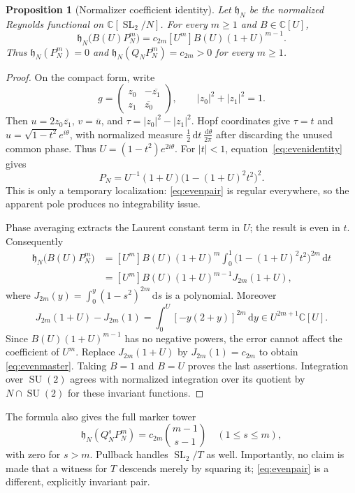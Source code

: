 \documentclass[11pt]{article}
\numberwithin{equation}{section}
\newtheorem{proposition}[theorem]{Proposition}
\theoremstyle{definition}
\theoremstyle{remark}
\newcommand{\C}{\mathbb C}
\newcommand{\dd}{\,\mathrm d}
\DeclareMathOperator{\SL}{SL}
\DeclareMathOperator{\SU}{SU}
\begin{document}
\begin{proposition}[Normalizer coefficient identity]\label{prop:normalizer}
Let $\mathfrak h_N$ be the normalized Reynolds functional on $\C[\SL_2/N]$. For every $m\geq1$ and $B\in\C[U]$,
\begin{equation}\label{eq:evenmaster}
 \mathfrak h_N\bigl(B(U)P_N^m\bigr)
 =c_{2m}[U^m]B(U)(1+U)^{m-1}.
\end{equation}
Thus $\mathfrak h_N(P_N^m)=0$ and $\mathfrak h_N(Q_NP_N^m)=c_{2m}>0$ for every $m\geq1$.
\end{proposition}
\begin{proof}
On the compact form, write
\[
 g=\begin{pmatrix}z_0&-\overline{z_1}\\ z_1&\overline{z_0}\end{pmatrix},
 \qquad |z_0|^2+|z_1|^2=1.
\]
Then $u=2z_0\overline{z_1}$, $v=\overline u$, and $\tau=|z_0|^2-|z_1|^2$. Hopf coordinates give $\tau=t$ and $u=\sqrt{1-t^2}e^{i\theta}$, with normalized measure $\frac12\dd t\,\frac{\dd\theta}{2\pi}$ after discarding the unused common phase. Thus $U=(1-t^2)e^{2i\theta}$. For $|t|<1$, equation~\eqref{eq:evenidentity} gives
\[
 P_N=U^{-1}(1+U)\bigl(1-(1+U)^2t^2\bigr)^2.
\]
This is only a temporary localization: \eqref{eq:evenpair} is regular everywhere, so the apparent pole produces no integrability issue.

Phase averaging extracts the Laurent constant term in $U$; the result is even in $t$. Consequently
\begin{align*}
 \mathfrak h_N\bigl(B(U)P_N^m\bigr)
 &=[U^m]B(U)(1+U)^m\int_0^1\bigl(1-(1+U)^2t^2\bigr)^{2m}\dd t\\
 &=[U^m]B(U)(1+U)^{m-1}J_{2m}(1+U),
\end{align*}
where $J_{2m}(y)=\int_0^y(1-s^2)^{2m}\dd s$ is a polynomial. Moreover
\[
 J_{2m}(1+U)-J_{2m}(1)
 =\int_0^U[-y(2+y)]^{2m}\dd y
 \in U^{2m+1}\C[U].
\]
Since $B(U)(1+U)^{m-1}$ has no negative powers, the error cannot affect the coefficient of $U^m$. Replace $J_{2m}(1+U)$ by $J_{2m}(1)=c_{2m}$ to obtain \eqref{eq:evenmaster}. Taking $B=1$ and $B=U$ proves the last assertions. Integration over $\SU(2)$ agrees with normalized integration over its quotient by $N\cap\SU(2)$ for these invariant functions.
\end{proof}

The formula also gives the full marker tower
\[
 \mathfrak h_N(Q_N^sP_N^m)=c_{2m}\binom{m-1}{s-1}
 \quad(1\leq s\leq m),
\]
with zero for $s>m$. Pullback handles $\SL_2/T$ as well. Importantly, no claim is made that a witness for $T$ descends merely by squaring it; \eqref{eq:evenpair} is a different, explicitly invariant pair.
\end{document}

